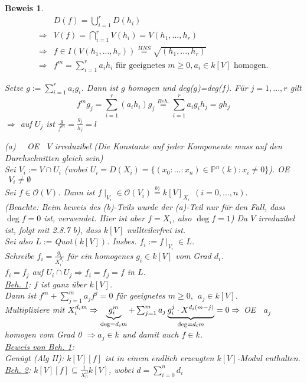 \documentclass[a4paper,12pt]{report}
\theoremstyle{break}
\theoremstyle{nonumberbreak}
\theoremstyle{nonumberplain}
\newtheorem{Bew}{Beweis}
\renewcommand{\OE}{O\!\!E~}
\begin{document}
\begin{Bew}
\begin{align*}
& D(f)=\bigcup_{i=1}^rD(h_i)\\
\Rightarrow & V(f)=\bigcap_{i=1}^rV(h_i)=V(h_1,...,h_r)\\
\Rightarrow & f\in I(V(h_1,...,h_r))\stackrel{HNS}{=} \sqrt{(h_1,...,h_r)}\\
\Rightarrow & f^m=\sum_{i=1}^ra_ih_i \text{ für geeignetes } m\geq 0, a_i\in k[V] \text{ homogen.}
\end{align*}

Setze $g:= \sum_{i=1}^ra_ig_i$. Dann ist $g$ homogen und deg($g$)=deg($f$). Für $j=1,...,r$ gilt
$$f^mg_j=\sum_{i=1}^r(a_ih_i)g_j\stackrel{Beh.}{=}\sum_{i=1}^ra_ig_ih_j=gh_j$$
$\Rightarrow$ auf $U_j$ ist $\frac{g}{f^m}=\frac{g_j}{h_j}=l$

(a)~~ \OE $~~V$ irreduzibel (Die Konstante auf jeder Komponente muss auf den Durchschnitten gleich sein)\\
Sei $V_i:= V\cap U_i$ (wobei $U_i=D(X_i)=\{(x_0:...:x_n)\in\mathbb{P}^n(k): x_i\neq 0\}$). \OE $~~V_i\neq\emptyset$\\
Sei $f\in\mathcal{O}(V)$. Dann ist $f\mid_{V_i}\in\mathcal{O}(V_i)\stackrel{b)}{=}k[V]_{X_i} ~~(i=0,...,n).$\\
(Beachte: Beim beweis des (b)-Teils wurde der (a)-Teil nur für den Fall, dass $\deg f=0$ ist, verwendet. Hier ist aber $f=X_i$, also $\deg f=1$)
Da $V$ irreduzibel ist, folgt mit 2.8.7 b), dass $k[V]$ nullteilerfrei ist.\\
Sei also $L:=$Quot$(k[V])$. Insbes. $f_i:=f\mid_{V_i}\in L$.\\
Schreibe $f_i=\frac{g_i}{X_i^{d_i}}$ für ein homogenes $g_i\in k[V]$ vom Grad $d_i$.\\
$f_i=f_j$ auf $U_i\cap U_j \Rightarrow f_i=f_j=f$ in $L$.\\
\underline{Beh. 1}: $f$ ist ganz über $k[V]$.\\
Dann ist $f^m+\sum_{j=1}^ma_jf^j=0$ für geeignetes $m\geq 0,~~ a_j\in k[V]$.\\
Multipliziere mit $X_i^{d_im}\Rightarrow \underbrace{g_i^m}_{\deg = d_im}+ \sum_{j=1}^ma_j\underbrace{g_i^j\cdot X^{d_i(m-j)}}_{\deg = d_im}=0\\
\Rightarrow$ \OE $~~a_j$ homogen vom Grad 0 $\Rightarrow a_j\in k$ und damit auch $f\in k$.\\
\underline{Beweis von Beh. 1}:\\
Genügt (Alg II): $k[V][f]$ ist in einem endlich erzeugten $k[V]$-Modul enthalten.\\
\underline{Beh. 2}: $k[V][f]\subseteq \frac{1}{X_0^d}k[V]$, wobei $d=\sum_{i=0}^nd_i$\\

\end{Bew}
\end{document}
